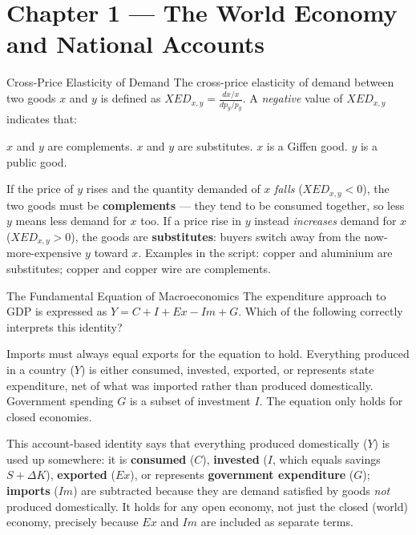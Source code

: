 \section{Chapter 1 — The World Economy and National Accounts}

\begin{question}[type=mc]{Cross-Price Elasticity of Demand}
The cross-price elasticity of demand between two goods $x$ and $y$ is
defined as $XED_{x,y} = \frac{dx/x}{dp_y/p_y}$. A \emph{negative} value of
$XED_{x,y}$ indicates that:
\begin{choices}
  \choice        $x$ and $y$ are complements.
  \correctchoice $x$ and $y$ are substitutes.
  \choice        $x$ is a Giffen good.
  \choice        $y$ is a public good.
\end{choices}
\begin{solution}
  If the price of $y$ rises and the quantity demanded of $x$ \emph{falls}
  ($XED_{x,y} < 0$), the two goods must be \textbf{complements} --- they tend
  to be consumed together, so less $y$ means less demand for $x$ too. If a
  price rise in $y$ instead \emph{increases} demand for $x$ ($XED_{x,y}>0$),
  the goods are \textbf{substitutes}: buyers switch away from the
  now-more-expensive $y$ toward $x$. Examples in the script: copper and
  aluminium are substitutes; copper and copper wire are complements.
\end{solution}
\end{question}

\begin{question}[type=mc]{The Fundamental Equation of Macroeconomics}
The expenditure approach to GDP is expressed as $Y = C + I + Ex - Im + G$.
Which of the following correctly interprets this identity?
\begin{choices}
  \choice        Imports must always equal exports for the equation to hold.
  \correctchoice Everything produced in a country ($Y$) is either consumed,
                 invested, exported, or represents state expenditure, net of
                 what was imported rather than produced domestically.
  \choice        Government spending $G$ is a subset of investment $I$.
  \choice        The equation only holds for closed economies.
\end{choices}
\begin{solution}
  This account-based identity says that everything produced domestically
  ($Y$) is used up somewhere: it is \textbf{consumed} ($C$), \textbf{invested}
  ($I$, which equals savings $S+\Delta K$), \textbf{exported} ($Ex$), or
  represents \textbf{government expenditure} ($G$); \textbf{imports} ($Im$)
  are subtracted because they are demand satisfied by goods \emph{not}
  produced domestically. It holds for any open economy, not just the closed
  (world) economy, precisely because $Ex$ and $Im$ are included as separate
  terms.
\end{solution}
\end{question}


